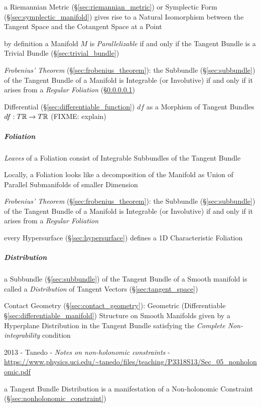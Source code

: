 a Riemannian Metric (\S\ref{sec:riemannian_metric}) or Symplectic Form
(\S\ref{sec:symplectic_manifold}) gives rise to a Natural Isomorphism between
the Tangent Space and the Cotangent Space at a Point

by definition a Manifold $M$ is \emph{Parallelizable} if and only if the
Tangent Bundle is a Trivial Bundle (\S\ref{sec:trivial_bundle})

\emph{Frobenius' Theorem} (\S\ref{sec:frobenius_theorem}): the Subbundle
(\S\ref{sec:subbundle}) of the Tangent Bundle of a Manifold is Integrable (or
Involutive) if and only if it arises from a \emph{Regular Foliation}
(\S\ref{sec:foliation})

Differential (\S\ref{sec:differentiable_function}) $df$ as a Morphism of
Tangent Bundles $df : T\mathbb{R} \rightarrow T\mathbb{R}$ (FIXME: explain)



\subparagraph{Foliation}\label{sec:foliation}\hfill

\emph{Leaves} of a Foliation consist of Integrable Subbundles of the Tangent
Bundle

Locally, a Foliation looks like a decomposition of the Manifold as Union of
Parallel Submanifolds of smaller Dimension

\emph{Frobenius' Theorem} (\S\ref{sec:frobenius_theorem}): the Subbundle
(\S\ref{sec:subbundle}) of the Tangent Bundle of a Manifold is Integrable (or
Involutive) if and only if it arises from a \emph{Regular Foliation}

every Hypersurface (\S\ref{sec:hypersurface}) defines a 1D Characteristic
Foliation



\subparagraph{Distribution}\label{sec:tangent_bundle_distribution}\hfill

a Subbundle (\S\ref{sec:subbundle}) of the Tangent Bundle of a Smooth manifold
is called a \emph{Distribution} of Tangent Vectors (\S\ref{sec:tangent_space})

\fist Contact Geometry (\S\ref{sec:contact_geometry}): Geometric (Differentiable
\S\ref{sec:differentiable_manifold}) Structure on Smooth Manifolds given by a
Hyperplane Distribution in the Tangent Bundle satisfying the \emph{Complete
  Non-integrability} condition

2013 - Tanedo - \emph{Notes on non-holonomic constraints} -
\url{https://www.physics.uci.edu/~tanedo/files/teaching/P3318S13/Sec_05_nonholonomic.pdf}

a Tangent Bundle Distribution is a manifestation of a Non-holonomic Constraint
(\S\ref{sec:nonholonomic_constraint})



